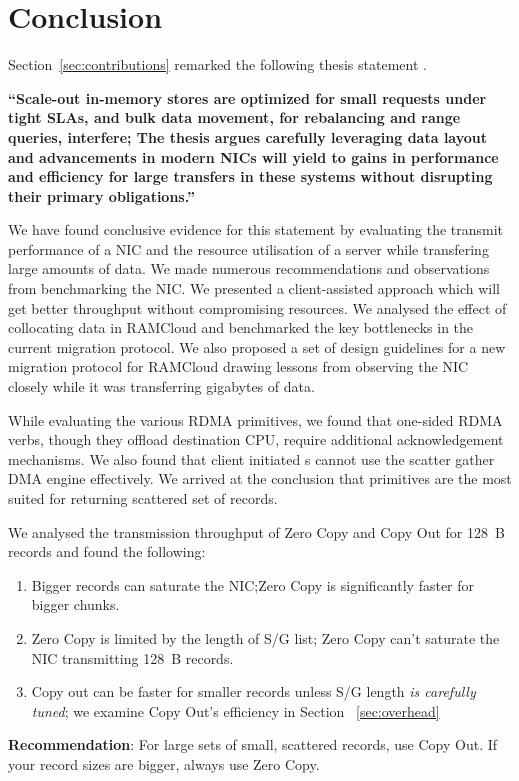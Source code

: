 
\chapter{Conclusion}
\label{chap:conclusion}
Section~\ref{sec:contributions} remarked the following thesis statement .

\textbf{\enquote{Scale-out in-memory stores are optimized for small requests
under tight SLAs, and bulk data movement, for rebalancing and range queries, interfere;
The thesis argues carefully leveraging data layout and advancements in modern NICs
will yield to gains in performance and efficiency for large transfers in these systems
without disrupting their primary obligations.}}

We have found conclusive evidence for this statement by evaluating the transmit performance 
of a NIC and the resource utilisation of a server while transfering large amounts of data. We 
made numerous recommendations and observations from benchmarking the NIC. We presented a client-assisted 
approach which will get better throughput without compromising resources. We analysed the effect of collocating
data in RAMCloud and benchmarked the key bottlenecks in the current migration protocol. We also proposed a set of design 
guidelines for a new migration protocol for RAMCloud drawing lessons from observing the NIC closely while it was 
transferring gigabytes of data. 

While evaluating the various RDMA primitives, we found that one-sided RDMA verbs, though they offload destination CPU, 
require additional acknowledgement mechanisms. We also found that client initiated s cannot use the 
scatter gather DMA engine effectively. We arrived at the conclusion that  primitives 
are the most suited for returning scattered set of records.

We analysed the transmission throughput of Zero Copy and Copy Out for 128~B records and found the following:
  \begin{enumerate}
  \item Bigger records can saturate the NIC;Zero Copy is significantly faster for bigger chunks.
  \item Zero Copy is limited by the length of S/G list; Zero Copy can't saturate the NIC transmitting 128~B records.
  \item Copy out can be faster for smaller records unless S/G length {\em is carefully tuned}; we examine Copy Out's efficiency in Section ~\ref{sec:overhead}
  \end{enumerate}
  \textbf{Recommendation}: For large sets of small, scattered records, use Copy Out. If your record sizes are bigger, always use Zero Copy.

